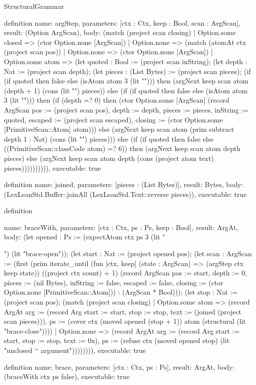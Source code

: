 \begin{lexlean}{StructuralGrammar}
\begin{semanticmodule}
definition{
  name: argStep,
  parameters: [ctx : Ctx, keep : Bool, scan : ArgScan],
  result: (Option ArgScan),
  body: (match (project scan closing)
    | Option.some closed => (ctor Option.none [ArgScan])
    | Option.none => (match (atomAt ctx (project scan pos))
      | Option.none => (ctor Option.none [ArgScan])
      | Option.some atom => (let quoted : Bool := (project scan inString); (let depth : Nat := (project scan depth); (let pieces : (List Bytes) := (project scan pieces); (if (if quoted then false else (isAtom atom 3 (lit "{"))) then (argNext keep scan atom (depth + 1) (cons (lit "{") pieces)) else (if (if quoted then false else (isAtom atom 3 (lit "}"))) then (if (depth =? 0) then (ctor Option.some [ArgScan] (record ArgScan {pos := (project scan pos), depth := depth, pieces := pieces, inString := quoted, escaped := (project scan escaped), closing := (ctor Option.some [PrimitiveScan::Atom] atom)})) else (argNext keep scan atom (prim subtract depth 1 : Nat) (cons (lit "}") pieces))) else (if (if quoted then false else ((PrimitiveScan::classCode atom) =? 6)) then (argNext keep scan atom depth pieces) else (argNext keep scan atom depth (cons (project atom text) pieces)))))))))),
  executable: true
}

definition{
  name: joined,
  parameters: [pieces : (List Bytes)],
  result: Bytes,
  body: (LexLeanStd.Buffer::joinAll (LexLeanStd.Text::reverse pieces)),
  executable: true
}

definition{
  name: braceWith,
  parameters: [ctx : Ctx, ps : Ps, keep : Bool],
  result: ArgAt,
  body: (let opened : Ps := (expectAtom ctx ps 3 (lit "{") (lit "brace-open")); (let start : Nat := (project opened pos); (let scan : ArgScan := (first (prim iterate_until (fun [ctx, keep] (state : ArgScan) => (argStep ctx keep state)) ((project ctx count) + 1) (record ArgScan {pos := start, depth := 0, pieces := (nil Bytes), inString := false, escaped := false, closing := (ctor Option.none [PrimitiveScan::Atom])}) : (ArgScan * Bool))); (let stop : Nat := (project scan pos); (match (project scan closing)
    | Option.some atom => (record ArgAt {arg := (record Arg {start := start, stop := stop, text := (joined (project scan pieces))}), ps := (cover ctx (moved opened (stop + 1)) atom (structural (lit "brace-close")))})
    | Option.none => (record ArgAt {arg := (record Arg {start := start, stop := stop, text := 0x}), ps := (refuse ctx (moved opened stop) (lit "unclosed `{` argument"))})))))),
  executable: true
}

definition{
  name: brace,
  parameters: [ctx : Ctx, ps : Ps],
  result: ArgAt,
  body: (braceWith ctx ps false),
  executable: true
}

}}
\end{semanticmodule}
\end{lexlean}
